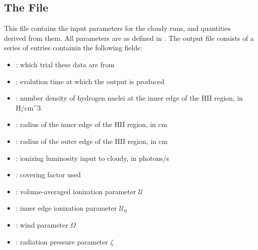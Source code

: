 \documentclass[letterpaper,10pt,english]{sphinxmanual}
\begin{document}
\subsection{The  File}
\label{\detokenize{cloudy:the-integrated-cloudyparams-file}}
This file contains the input parameters for the cloudy runs, and
quantities derived from them. All parameters are as defined in
{\hyperref[\detokenize{cloudy:sssec-cloudy-nebular-properties}]{}}. The output file consists of a
series of entries containin the following fields:
\begin{itemize}
\item {} 
: which trial these data are from

\item {} 
: evolution time at which the output is produced

\item {} 
: number density of hydrogen nuclei at the inner edge of the
HII region, in H/cm\textasciicircum{}3

\item {} 
: radius of the inner edge of the HII region, in cm

\item {} 
: radius of the outer edge of the HII region, in cm

\item {} 
: ionizing luminosity input to cloudy, in photons/s

\item {} 
: covering factor used

\item {} 
: volume-averaged ionization parameter \(\mathcal{U}\)

\item {} 
: inner edge ionization parameter \(\mathcal{U}_0\)

\item {} 
: wind parameter \(\Omega\)

\item {} 
: radiation pressure parameter \(\zeta\)

\end{itemize}
\end{document}
